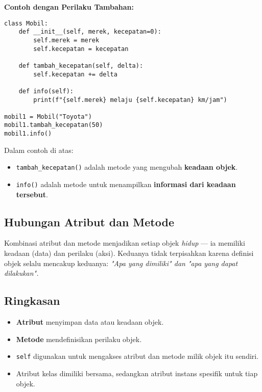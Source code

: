 \noindent\textbf{Contoh dengan Perilaku Tambahan:}
\begin{lstlisting}[style=PythonStyle, caption={Metode yang Mengubah Keadaan Objek}]
class Mobil:
    def __init__(self, merek, kecepatan=0):
        self.merek = merek
        self.kecepatan = kecepatan

    def tambah_kecepatan(self, delta):
        self.kecepatan += delta

    def info(self):
        print(f"{self.merek} melaju {self.kecepatan} km/jam")

mobil1 = Mobil("Toyota")
mobil1.tambah_kecepatan(50)
mobil1.info()
\end{lstlisting}

Dalam contoh di atas:
\begin{itemize}
    \item \texttt{tambah_kecepatan()} adalah metode yang mengubah \textbf{keadaan objek}.
    \item \texttt{info()} adalah metode untuk menampilkan \textbf{informasi dari keadaan tersebut}.
\end{itemize}

\subsection*{Hubungan Atribut dan Metode}
Kombinasi atribut dan metode menjadikan setiap objek \emph{hidup} — ia memiliki keadaan (data) dan perilaku (aksi).  
Keduanya tidak terpisahkan karena definisi objek selalu mencakup keduanya:  
\emph{"Apa yang dimiliki" dan "apa yang dapat dilakukan".}

\begin{center}
\end{center}


\subsection*{Ringkasan}
\begin{itemize}
    \item \textbf{Atribut} menyimpan data atau keadaan objek.
    \item \textbf{Metode} mendefinisikan perilaku objek.
    \item \texttt{self} digunakan untuk mengakses atribut dan metode milik objek itu sendiri.
    \item Atribut kelas dimiliki bersama, sedangkan atribut instans spesifik untuk tiap objek.
\end{itemize}

